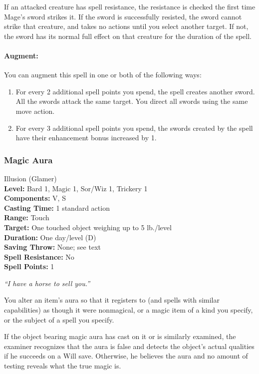 If an attacked creature has spell resistance, the resistance is checked the first time Mage's sword strikes it. 
If the sword is successfully resisted, the sword cannot strike that creature, and takes no actions until you select another target. 
If not, the sword has its normal full effect on that creature for the duration of the spell.

\paragraph{Augment:} You can augment this spell in one or both of the following ways:
\begin{enumerate}
 \item For every 2 additional spell points you spend, the spell creates another sword. 
All the swords attack the same target. You direct all swords using the same move action.
 \item For every 3 additional spell points you spend, the swords created by the spell have their enhancement bonus increased by 1.
\end{enumerate}
\subsubsection{Magic Aura}
\label{Spell:MagicAura}
Illusion (Glamer)
\\ \textbf{Level:} Bard 1, Magic 1, Sor/Wiz 1, Trickery 1
\\ \textbf{Components:} V, S
\\ \textbf{Casting Time:} 1 standard action
\\ \textbf{Range:} Touch
\\ \textbf{Target:} One touched object weighing up to 5 lb./level
\\ \textbf{Duration:} One day/level (D)
\\ \textbf{Saving Throw:} None; see text
\\ \textbf{Spell Resistance:} No
\\ \textbf{Spell Points:} 1

\emph{``I have a horse to sell you.''}

You alter an item's aura so that it registers to  (and spells with similar capabilities) as though it were nonmagical, or a magic item of a kind you specify, or the subject of a spell you specify.

If the object bearing magic aura has  cast on it or is similarly examined, 
the examiner recognizes that the aura is false and detects the object's actual qualities if he succeeds on a Will save. 
Otherwise, he believes the aura and no amount of testing reveals what the true magic is.

